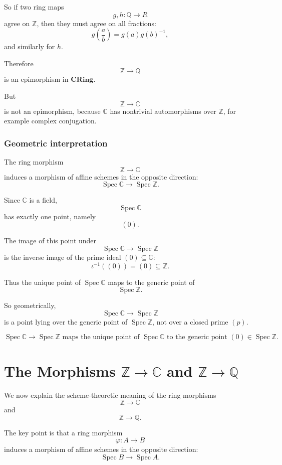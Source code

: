 \documentclass[12pt,a4paper]{article}
\DeclareMathOperator{\Spec}{Spec}
\theoremstyle{notespace}
\begin{document}
So if two ring maps
\[
g,h:\mathbb Q\to R
\]
agree on \(\mathbb Z\), then they must agree on all fractions:
\[
g\left(\frac{a}{b}\right)
=
g(a)g(b)^{-1},
\]
and similarly for \(h\).

Therefore
\[
\mathbb Z\to \mathbb Q
\]
is an epimorphism in \(\mathbf{CRing}\).

But
\[
\mathbb Z\to \mathbb C
\]
is not an epimorphism, because \(\mathbb C\) has nontrivial automorphisms over \(\mathbb Z\), for example complex conjugation.

\subsubsection*{Geometric interpretation}

The ring morphism
\[
\mathbb Z\to \mathbb C
\]
induces a morphism of affine schemes in the opposite direction:
\[
\operatorname{Spec}\mathbb C\longrightarrow \operatorname{Spec}\mathbb Z.
\]

Since \(\mathbb C\) is a field,
\[
\operatorname{Spec}\mathbb C
\]
has exactly one point, namely
\[
(0).
\]

The image of this point under
\[
\operatorname{Spec}\mathbb C\to \operatorname{Spec}\mathbb Z
\]
is the inverse image of the prime ideal \((0)\subseteq \mathbb C\):
\[
\iota^{-1}((0))=(0)\subseteq \mathbb Z.
\]

Thus the unique point of \(\operatorname{Spec}\mathbb C\) maps to the generic point of
\[
\operatorname{Spec}\mathbb Z.
\]

So geometrically,
\[
\operatorname{Spec}\mathbb C\to \operatorname{Spec}\mathbb Z
\]
is a point lying over the generic point of \(\operatorname{Spec}\mathbb Z\), not over a closed prime \((p)\).

\[
\boxed{
	\operatorname{Spec}\mathbb C\to \operatorname{Spec}\mathbb Z
	\text{ maps the unique point of }\operatorname{Spec}\mathbb C
	\text{ to the generic point }(0)\in\operatorname{Spec}\mathbb Z.
}
\]
\section{The Morphisms \texorpdfstring{\(\mathbb Z\to \mathbb C\)}{Z to C}
	and \texorpdfstring{\(\mathbb Z\to \mathbb Q\)}{Z to Q}}

We now explain the scheme-theoretic meaning of the ring morphisms
\[
\mathbb Z\longrightarrow \mathbb C
\]
and
\[
\mathbb Z\longrightarrow \mathbb Q.
\]

The key point is that a ring morphism
\[
\varphi:A\to B
\]
induces a morphism of affine schemes in the opposite direction:
\[
\Spec B\longrightarrow \Spec A.
\]
\end{document}
